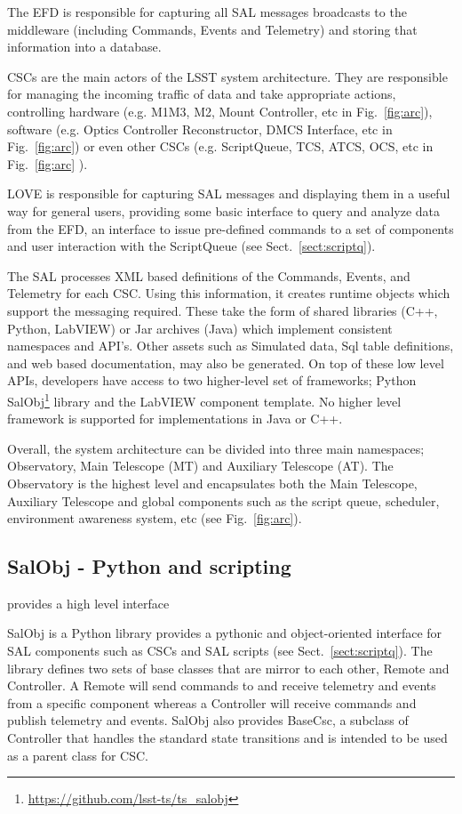 The EFD is responsible for capturing all SAL messages broadcasts to the middleware (including Commands, Events and Telemetry) and storing that information into a database.

CSCs are the main actors of the LSST system architecture. They are responsible for managing the incoming traffic of data and take 
appropriate actions, controlling hardware (e.g. M1M3, M2, Mount Controller, etc in Fig.~\ref{fig:arc}), software (e.g. Optics Controller 
Reconstructor, DMCS Interface, etc in Fig.~\ref{fig:arc}) or even other CSCs (e.g. ScriptQueue, TCS, ATCS, OCS, etc in 
Fig.~\ref{fig:arc} ).

LOVE is responsible for capturing SAL messages and displaying them in a useful way for general users, providing some basic interface to 
query and analyze data from the EFD, an interface to issue pre-defined commands to a set of components and user interaction with the 
ScriptQueue (see Sect.~\ref{sect:scriptq}).

The SAL processes XML based definitions of the Commands, Events, and Telemetry for each CSC. Using this information, it creates 
runtime objects which support the messaging required. These take the form of shared libraries (C++, Python, LabVIEW) or Jar archives 
(Java) which implement consistent namespaces and API's. Other assets such as Simulated data, Sql table definitions, and web based 
documentation, may also be generated. On top of these low level APIs, developers have access to two higher-level set of frameworks; 
Python SalObj\footnote{\url{https://github.com/lsst-ts/ts_salobj}} library and the LabVIEW component template. No higher level framework 
is supported for implementations in Java or C++.

Overall, the system architecture can be divided into three main namespaces; Observatory, Main Telescope (MT) and Auxiliary Telescope 
(AT). The Observatory is the highest level and encapsulates both the Main Telescope, Auxiliary Telescope and global components such
as the script queue, scheduler, environment awareness system, etc (see Fig.~\ref{fig:arc}).

\subsection{SalObj - Python and scripting }\label{sect:salobj}

provides a high level interface 

SalObj is a Python library provides a pythonic and object-oriented interface for SAL components such as CSCs and SAL 
scripts (see Sect.~\ref{sect:scriptq}). The library defines two sets of base classes that are mirror to each other, 
Remote and Controller. A Remote will send commands to and receive telemetry and events from a specific component whereas a 
Controller will receive commands and publish telemetry and events. SalObj also provides BaseCsc, a subclass of Controller 
that handles the standard state transitions and is intended to be used as a parent class for CSC.

